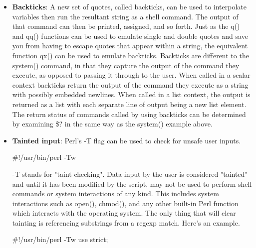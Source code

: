 \documentclass{report}
\begin{document}
\begin{itemize}
            \bigbreak \noindent 
            Just like regular system, the run command uses the standard shell when running a single command, or invokes the command directly when called in a multiple argument fashion:
        \item \textbf{Backticks}: A new set of quotes, called backticks, can be used to interpolate variables then run the resultant string as a shell command. The output of that command can then be printed, assigned, and so forth.
            \bigbreak \noindent 
            Just as the q() and qq() functions can be used to emulate single and double quotes and save you from having to escape quotes that appear within a string, the equivalent function qx() can be used to emulate backticks.
            \bigbreak \noindent 
            Backticks are different to the system() command, in that they capture the output of the command they execute, as opposed to passing it through to the user.
            \bigbreak \noindent 
            When called in a scalar context backticks return the output of the command they execute as a string with possibly embedded newlines. When called in a list context, the output is returned as a list with each separate line of output being a new list element.
            \bigbreak \noindent 
            The return status of commands called by using backticks can be determined by examining \$? in the same way as the system() example above.
        \item \textbf{Tainted input}: Perl’s -T flag can be used to check for unsafe user inputs.
            \bigbreak \noindent 
            \begin{perlcode}
            #!/usr/bin/perl -Tw
            \end{perlcode}
            \bigbreak \noindent 
            -T stands for "taint checking". Data input by the user is considered "tainted" and until it has been modified by the script, may not be used to perform shell commands or system interactions of any kind. This includes system interactions such as open(), chmod(), and any other built-in Perl function which interacts with the operating system.
            \bigbreak \noindent 
            The only thing that will clear tainting is referencing substrings from a regexp match. Here’s an example.
            \bigbreak \noindent 
            \begin{perlcode}
                #!/usr/bin/perl -Tw
                use strict;


\end{perlcode}
\end{itemize}
\end{document}
